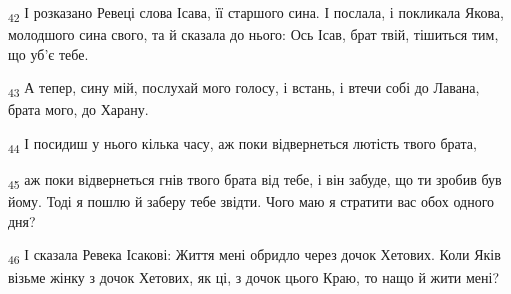 \begin{tcolorbox}
\textsubscript{42} І розказано Ревеці слова Ісава, її старшого сина. І послала, і покликала Якова, молодшого сина свого, та й сказала до нього: Ось Ісав, брат твій, тішиться тим, що уб'є тебе.
\end{tcolorbox}
\begin{tcolorbox}
\textsubscript{43} А тепер, сину мій, послухай мого голосу, і встань, і втечи собі до Лавана, брата мого, до Харану.
\end{tcolorbox}
\begin{tcolorbox}
\textsubscript{44} І посидиш у нього кілька часу, аж поки відвернеться лютість твого брата,
\end{tcolorbox}
\begin{tcolorbox}
\textsubscript{45} аж поки відвернеться гнів твого брата від тебе, і він забуде, що ти зробив був йому. Тоді я пошлю й заберу тебе звідти. Чого маю я стратити вас обох одного дня?
\end{tcolorbox}
\begin{tcolorbox}
\textsubscript{46} І сказала Ревека Ісакові: Життя мені обридло через дочок Хетових. Коли Яків візьме жінку з дочок Хетових, як ці, з дочок цього Краю, то нащо й жити мені?
\end{tcolorbox}
